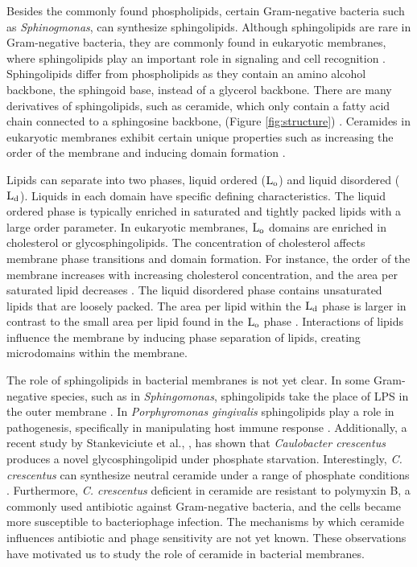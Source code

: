 \documentclass[10pt, letterpaper]{article}
\begin{document}
\par Besides the commonly found phospholipids, certain Gram-negative bacteria such as \textit{Sphinogmonas}, can synthesize sphingolipids. Although sphingolipids are rare in  Gram-negative bacteria, they are commonly found in eukaryotic membranes, where sphingolipids play an important role in signaling and cell recognition \cite{alonso2018physical, veiga1999ceramides,zhang2009ceramide}. Sphingolipids differ from phospholipids as they contain an amino alcohol backbone, the sphingoid base, instead of a glycerol backbone. There are many derivatives of sphingolipids, such as ceramide, which only contain a fatty acid chain connected to a sphingosine backbone, (Figure \ref{fig:structure}) \cite{alonso2018physical, zhang2009ceramide}. Ceramides in eukaryotic membranes exhibit certain unique properties such as increasing the order of the membrane and inducing domain formation \cite{alonso2018physical, veiga1999ceramides}. 
\par Lipids can separate into two phases, liquid ordered ($\rm L_o$) and liquid disordered ($\rm L_d$). Liquids in each domain have specific defining characteristics. The liquid ordered phase is typically enriched in saturated and tightly packed lipids with a large order parameter. In eukaryotic membranes, $\rm L_o$ domains are enriched in cholesterol or glycosphingolipids. The concentration of cholesterol affects membrane phase transitions and domain formation. For instance, the order of the membrane increases with increasing cholesterol concentration, and the area per saturated lipid decreases \cite{wang2016dppc}. The liquid disordered phase contains unsaturated lipids that are loosely packed. The area per lipid within the $\rm L_d$ phase is larger in contrast to the small area per lipid found in the $\rm L_o$ phase \cite{van2008membrane}. Interactions of lipids influence the membrane by inducing phase separation of lipids, creating microdomains within the membrane.


\par The role of sphingolipids in bacterial membranes is not yet clear. In some Gram-negative species, such as in \textit{Sphingomonas}, sphingolipids take the place of LPS in the outer membrane \cite{kawasaki1994cell}. In \textit{Porphyromonas gingivalis} sphingolipids play a role in pathogenesis, specifically in manipulating host immune response \cite{rocha2020porphyromonas}. Additionally, a recent study by Stankeviciute et al., \cite{stankeviciute2019caulobacter}, has shown that \textit{Caulobacter crescentus}  produces a novel glycosphingolipid under phosphate starvation. Interestingly, \textit{C. crescentus} can synthesize neutral ceramide under a range of phosphate conditions \cite{stankeviciute2019caulobacter}. Furthermore,  \textit{C. crescentus} deficient in ceramide are resistant to polymyxin B, a commonly used antibiotic against Gram-negative bacteria, and the cells became more susceptible to bacteriophage infection. The mechanisms by which ceramide influences antibiotic and phage sensitivity are not yet known. These observations have motivated us to study the role of ceramide in bacterial membranes. 
\end{document}

